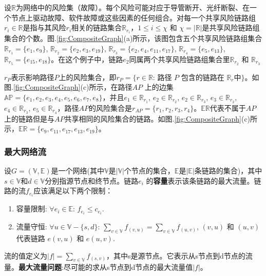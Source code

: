 设$\mathbb{R}$为网络中的风险集（故障）。每个风险可能对应于导管断开、光纤断裂、在一个节点上驱动故障、软件故障或这些因素的任何组合。对每一个共享风险链路组$r_i \in \mathbb{R}$是指与其风险$r_i$相关的链路集合$\mathbb{R}_{r_i}$，$1\leq i\leq \chi$ 和 $\chi=|{\mathbb{R}}|$是共享风险链路组集合的个数。图.\ref{fig:CompositeGraph}(a)所示，该图包含五个共享风险链路组集合$\mathbb{R}_{r_1}=\{e_1,e_9\}$, $\mathbb{R}_{r_2}=\{e_2,e_3,e_{19}\}$, $\mathbb{R}_{r_3}=\{e_2,e_4,e_{11},e_{17}\}$, $\mathbb{R}_{r_4}=\{e_5,e_{13}\}$, $\mathbb{R}_{r_5}=\{e_{15},e_{18}\}$。在这个例子中，链路$e_2$同属两个共享风险链路组集合里$\mathbb{R}_{r_2}$ 和 $\mathbb{R}_{r_3}$


$r_P$表示影响路径$P$上的风险集合，即$r_P=\{r\in \mathbb{R}$: 路径 $P$ 包含的链路在 $\mathbb{R}_r$中$\}$。如图.\ref{fig:CompositeGraph}(c)所示，在路径$AP$ 上的边集$\mathbb{AP}=\{e_1,e_2,e_3,e_4,e_5,e_6,e_7,e_8\}$，并且$e_1\in \mathbb{R}_{r_1}$, $e_2\in \mathbb{R}_{r_2}$, $e_2\in \mathbb{R}_{r_3}$, $e_3\in \mathbb{R}_{r_2}$, $e_4\in \mathbb{R}_{r_3}$, $e_5\in \mathbb{R}_{r_4}$，路径$AP$的风险集合是${r}_{{AP}}=\{r_1, r_2, r_3, r_4\}$。$\mathbb{\mathbb{ER}}$代表不属于$AP$上的链路但是与$AP$共享相同的风险集合的链路。如图.\ref{fig:CompositeGraph}(c)所示，$\mathbb{\mathbb{ER}}=\{e_9,e_{11},e_{17},e_{13},e_{19}\}$。




\subsubsection{最大网络流}
设$G=(\mathbb{\mathbb{V}},\mathbb{\mathbb{E}})$是一个网络(其中$\mathbb{\mathbb{V}}$是$|\mathbb{\mathbb{V}}|$个节点的集合，$\mathbb{\mathbb{E}}$是$|\mathbb{\mathbb{E}}|$条链路的集合)，其中$s\in \mathbb{V}$和$d\in \mathbb{V}$分别指源节点和终节点。链路$e_i$ 的\textbf{容量}表示该条链路的最大流量。链路的流$f_{e_i}$应该满足以下两个限制：
\begin{enumerate}
  \item 容量限制: $\forall e_i\in \mathbb{\mathbb{E}}$: $f_{e_i}\leq c_{e_i}$.
  \item 流量守恒: $\forall u\in \mathbb{\mathbb{V}}-\{s,d\}$: $\sum\limits_{v\in \mathbb{V}}f_{(v,u)}=\sum\limits_{v\in \mathbb{V}}f_{(u,v)}$,  $(v,u)$ 和 $(u,v)$ 代表链路 $e(v,u)$ 和 $e(u,v)$.
\end{enumerate}

流的值定义为$|f|=\sum\limits_{v\in \mathbb{V}}f_{(s,v)}$，其中s是源节点。它表示从s节点到d节点的流量。\textbf{最大流量问题}:尽可能的求从s节点到d节点的最大流量值$|f|$。

